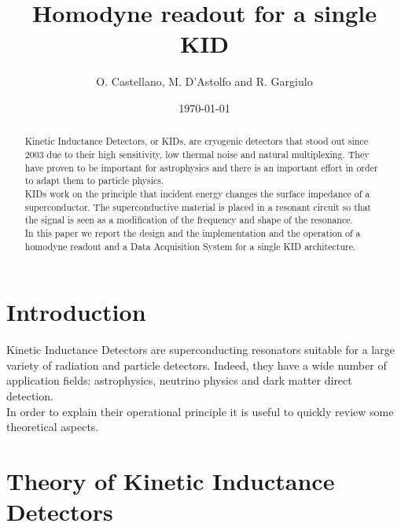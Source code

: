 \documentclass[12pt]{article}
\begin{document}
\title{Homodyne readout for a single KID}
\author{O. Castellano, M. D'Astolfo and R. Gargiulo}
\date{\today}
\maketitle

\begin{abstract}
Kinetic Inductance Detectors, or KIDs, are cryogenic detectors that stood out since 2003 due to their high sensitivity, low thermal noise and natural multiplexing. They have proven to be important for astrophysics and there is an important effort in order to adapt them to particle physics.\\
KIDs work on the principle that incident energy changes the surface impedance of a superconductor. 
The superconductive material is placed in a resonant circuit so that the signal is seen as a modification of the frequency and shape of the resonance.\\
In this paper we report the design and the implementation and the operation of a homodyne readout and a Data Acquisition System for a single KID architecture.
\end{abstract}

\tableofcontents

\newpage

\section{Introduction}
Kinetic Inductance Detectors are superconducting resonators suitable for a large variety of radiation and particle detectors. Indeed, they have a wide number of application fields: astrophysics, neutrino physics and dark matter direct detection.\\
In order to explain their operational principle it is useful to quickly review some theoretical aspects.

\section{Theory of Kinetic Inductance Detectors}
\end{document}
